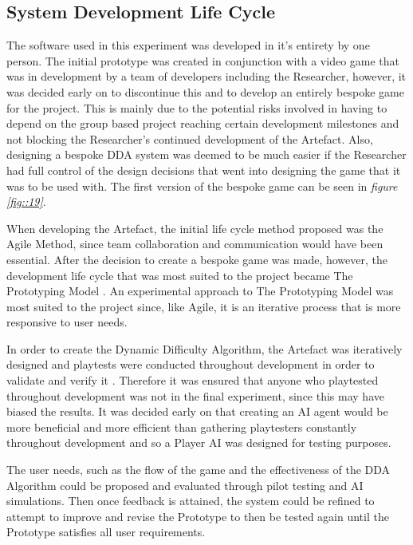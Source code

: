 \documentclass[journal]{IEEEtran}
\begin{document}
\subsection{System Development Life Cycle}

The software used in this experiment was developed in it's entirety by one person. The initial prototype was created in conjunction with a video game that was in development by a team of developers including the Researcher, however, it was decided early on to discontinue this and to develop an entirely bespoke game for the project. This is mainly due to the potential risks involved in having to depend on the group based project reaching certain development milestones and not blocking the Researcher's continued development of the Artefact. Also, designing a bespoke DDA system was deemed to be much easier if the Researcher had full control of the design decisions that went into designing the game that it was to be used with. The first version of the bespoke game can be seen in \textit{figure \ref{fig::19}}.

When developing the Artefact, the initial life cycle method proposed was the Agile Method, since team collaboration and communication would have been essential. After the decision to create a bespoke game was made, however, the development life cycle that was most suited to the project became The Prototyping Model \cite{isaias2015information}. An experimental approach to The Prototyping Model was most suited to the project since, like Agile, it is an iterative process that is more responsive to user needs. 

In order to create the Dynamic Difficulty Algorithm, the Artefact was iteratively designed and playtests were conducted throughout development in order to validate and verify it \cite{fullerton2004game}. Therefore it was ensured that anyone who playtested throughout development was not in the final experiment, since this may have biased the results. It was decided early on that creating an AI agent would be more beneficial and more efficient than gathering playtesters constantly throughout development and so a Player AI was designed for testing purposes.

The user needs, such as the flow of the game and the effectiveness of the DDA Algorithm could be proposed and evaluated through pilot testing and AI simulations. Then once feedback is attained, the system could be refined to attempt to improve and revise the Prototype to then be tested again until the Prototype satisfies all user requirements.
\end{document}
